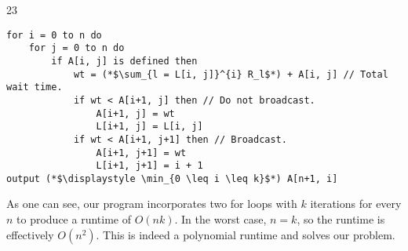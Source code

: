 \documentclass{article}
\begin{document}
\begin{prob} {23}
\begin{lstlisting}
for i = 0 to n do
    for j = 0 to n do
        if A[i, j] is defined then
            wt = (*$\sum_{l = L[i, j]}^{i} R_l$*) + A[i, j] // Total wait time.
            if wt < A[i+1, j] then // Do not broadcast.
                A[i+1, j] = wt
                L[i+1, j] = L[i, j]
            if wt < A[i+1, j+1] then // Broadcast.
                A[i+1, j+1] = wt
                L[i+1, j+1] = i + 1
output (*$\displaystyle \min_{0 \leq i \leq k}$*) A[n+1, i]
    \end{lstlisting}

    As one can see, our program incorporates two for loops with $k$ iterations for every $n$ to produce a runtime of $O(nk)$.  In the worst case, $n = k$, so the runtime is effectively $O(n^2)$.  This is indeed a polynomial runtime and solves our problem.
\end{prob}
\end{document}
